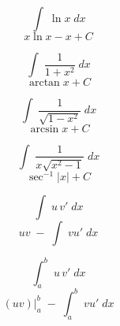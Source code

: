\documentclass[avery5371,grid]{flashcards}
\begin{document}
\begin{flashcard}{\large \vspace*{\fill} \[ \int\; \ln x \;dx \] \vspace*{\fill}   }{\large \vspace*{\fill} \[ x\ln x - x + C  \] \vspace*{\fill}   }\end{flashcard}

\begin{flashcard}{\large \vspace*{\fill} \[ \int\; \dfrac{1}{1+x^2} \;dx \] \vspace*{\fill}   }{\large \vspace*{\fill} \[ \arctan x + C   \] \vspace*{\fill}   }\end{flashcard}

\begin{flashcard}{\large \vspace*{\fill} \[ \int\; \dfrac{1}{\sqrt{1-x^2}} \;dx \] \vspace*{\fill}   }{\large \vspace*{\fill} \[ \arcsin x + C   \] \vspace*{\fill}   }\end{flashcard}

\begin{flashcard}{\large \vspace*{\fill} \[ \int\; \dfrac{1}{x \sqrt{x^2-1}} \;dx \] \vspace*{\fill}   }{\large \vspace*{\fill} \[ \sec^{-1}|x| + C   \] \vspace*{\fill}   }\end{flashcard}

\begin{flashcard}{\large \vspace*{\fill} \[ \int\; u \, v' \;dx \] \vspace*{\fill}   }{\large \vspace*{\fill} \[  uv \;-\; \int\; v u' \; dx  \] \vspace*{\fill}   }\end{flashcard}

\begin{flashcard}{\large \vspace*{\fill} \[ \int_a^b\; u \, v' \;dx \] \vspace*{\fill}   }{\large \vspace*{\fill} \[  (uv)\big|_a^b \;-\; \int_a^b\; v u' \; dx  \] \vspace*{\fill}   }\end{flashcard}
\end{document}

